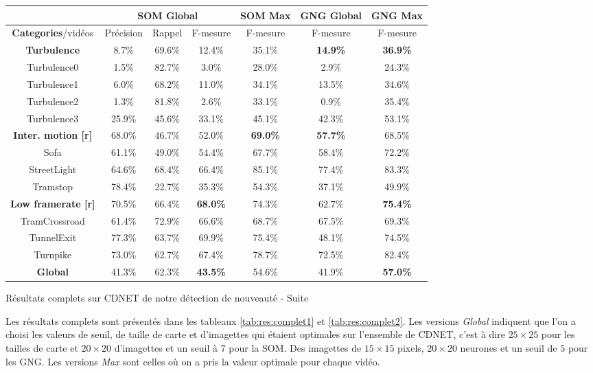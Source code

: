 	\begin{tableth}
    \begin{tabular}{|c|c|c|c|c|c|c|}
		\hline
		& \multicolumn{3}{c|}{SOM Global} & SOM Max & GNG Global & GNG Max\\
        \hline
        \textbf{Categories}/vidéos & Précision & Rappel & F-mesure & F-mesure & F-mesure & F-mesure\\
		\hline
        \textbf{Turbulence} & 8.7\% & 69.6\% & 12.4\% & 35.1\% & \textbf{14.9\%} & \textbf{36.9\%} \\
		\hline
		Turbulence0 & 1.5\% & 82.7\% & 3.0\% & 28.0\% & 2.9\% & 24.3\% \\
		Turbulence1 & 6.0\% & 68.2\% & 11.0\% & 34.1\% & 13.5\% & 34.6\% \\
		Turbulence2 & 1.3\% & 81.8\% & 2.6\% & 33.1\% & 0.9\% & 35.4\% \\
		Turbulence3 & 25.9\% & 45.6\% & 33.1\% & 45.1\% & 42.3\% & 53.1\% \\
		\hline
		\textbf{Inter. motion [r]} & 68.0\% & 46.7\% & 52.0\% & \textbf{69.0\%} & \textbf{57.7\%} & 68.5\% \\
		\hline
		Sofa & 61.1\% & 49.0\% & 54.4\% & 67.7\% & 58.4\% & 72.2\% \\
		StreetLight & 64.6\% & 68.4\% & 66.4\% & 85.1\% & 77.4\% & 83.3\% \\
		Tramstop & 78.4\% & 22.7\% & 35.3\% & 54.3\% & 37.1\% & 49.9\% \\
		\hline
        \textbf{Low framerate [r]} & 70.5\% & 66.4\% & \textbf{68.0\%} & 74.3\% & 62.7\% & \textbf{75.4\%} \\
		\hline
		TramCrossroad & 61.4\% & 72.9\% & 66.6\% & 68.7\% & 67.5\% & 69.3\% \\
		TunnelExit & 77.3\% & 63.7\% & 69.9\% & 75.4\% & 48.1\% & 74.5\% \\
		Turnpike & 73.0\% & 62.7\% & 67.4\% & 78.7\% & 72.5\% & 82.4\% \\
        \hline
        \textbf{Global} & 41.3\% & 62.3\% & \textbf{43.5\%} & 54.6\% & 41.9\% & \textbf{57.0\%} \\
    	\hline
	\end{tabular}
	\caption{Résultats complets sur CDNET de notre détection de nouveauté - Suite}
	\label{tab:res:complet2}
	\end{tableth}

	Les résultats complets sont présentés dans les tableaux \ref{tab:res:complet1} et \ref{tab:res:complet2}. Les versions \textit{Global} indiquent que l'on a choisi les valeurs de seuil, de taille de carte et d'imagettes qui étaient optimales sur l'ensemble de CDNET, c'est à dire $25\times25$ pour les tailles de carte et $20\times20$ d'imagettes et un seuil à $7$ pour la SOM. Des imagettes de $15\times15$ pixels, $20\times20$ neurones et un seuil de $5$ pour les GNG. Les versions \textit{Max} sont celles où on a pris la valeur optimale pour chaque vidéo.

